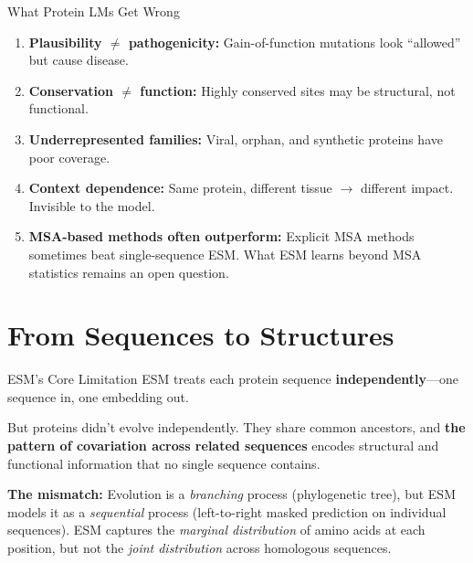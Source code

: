 \documentclass[aspectratio=169,10pt]{beamer}
\begin{document}
\begin{frame}{What Protein LMs Get Wrong}
\begin{enumerate}[<+->]
    \item \textbf{Plausibility $\neq$ pathogenicity:} Gain-of-function mutations look ``allowed'' but cause disease.
    \item \textbf{Conservation $\neq$ function:} Highly conserved sites may be structural, not functional.
    \item \textbf{Underrepresented families:} Viral, orphan, and synthetic proteins have poor coverage.
    \item \textbf{Context dependence:} Same protein, different tissue $\to$ different impact. Invisible to the model.
    \item \textbf{MSA-based methods often outperform:} Explicit MSA methods sometimes beat single-sequence ESM. What ESM learns beyond MSA statistics remains an open question.
\end{enumerate}
\end{frame}

\section{From Sequences to Structures}

\begin{frame}{ESM's Core Limitation}
ESM treats each protein sequence \textbf{independently}---one sequence in, one embedding out.

\vspace{0.3em}
But proteins didn't evolve independently. They share common ancestors, and \textbf{the pattern of covariation across related sequences} encodes structural and functional information that no single sequence contains.

\vspace{0.3em}
\textbf{The mismatch:} Evolution is a \emph{branching} process (phylogenetic tree), but ESM models it as a \emph{sequential} process (left-to-right masked prediction on individual sequences). ESM captures the \emph{marginal distribution} of amino acids at each position, but not the \emph{joint distribution} across homologous sequences.

\end{frame}
\end{document}
